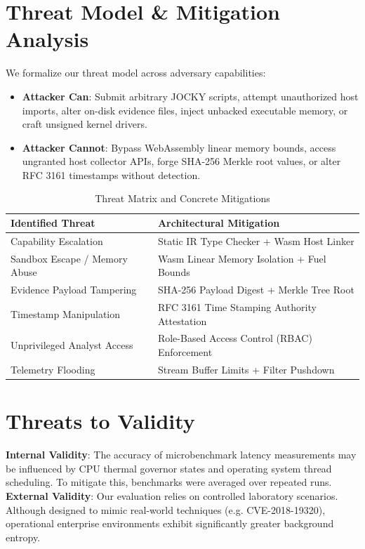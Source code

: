 \documentclass[10pt,conference]{IEEEtran}
\begin{document}
\section{Threat Model \& Mitigation Analysis}
We formalize our threat model across adversary capabilities:
\begin{itemize}
    \item \textbf{Attacker Can}: Submit arbitrary JOCKY scripts, attempt unauthorized host imports, alter on-disk evidence files, inject unbacked executable memory, or craft unsigned kernel drivers.
    \item \textbf{Attacker Cannot}: Bypass WebAssembly linear memory bounds, access ungranted host collector APIs, forge SHA-256 Merkle root values, or alter RFC 3161 timestamps without detection.
\end{itemize}

\begin{table}[h]
\centering
\caption{Threat Matrix and Concrete Mitigations}
\label{tab:threats}
\begin{tabular}{@{}ll@{}}
\toprule
\textbf{Identified Threat} & \textbf{Architectural Mitigation} \\ \midrule
Capability Escalation & Static IR Type Checker + Wasm Host Linker \\
Sandbox Escape / Memory Abuse & Wasm Linear Memory Isolation + Fuel Bounds \\
Evidence Payload Tampering & SHA-256 Payload Digest + Merkle Tree Root \\
Timestamp Manipulation & RFC 3161 Time Stamping Authority Attestation \\
Unprivileged Analyst Access & Role-Based Access Control (RBAC) Enforcement \\
Telemetry Flooding & Stream Buffer Limits + Filter Pushdown \\ \bottomrule
\end{tabular}
\end{table}

\section{Threats to Validity}
\textbf{Internal Validity}: The accuracy of microbenchmark latency measurements may be influenced by CPU thermal governor states and operating system thread scheduling. To mitigate this, benchmarks were averaged over repeated runs.
\textbf{External Validity}: Our evaluation relies on controlled laboratory scenarios. Although designed to mimic real-world techniques (e.g. CVE-2018-19320), operational enterprise environments exhibit significantly greater background entropy.
\end{document}
